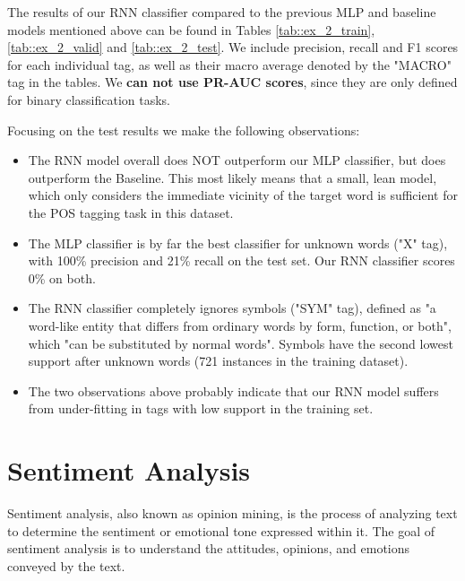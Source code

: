 \documentclass[10pt, a4paper]{article}
\begin{document}
	The results of our RNN classifier compared to the previous MLP and baseline models mentioned above can be found in Tables \ref{tab::ex_2_train}, \ref{tab::ex_2_valid} and \ref{tab::ex_2_test}. We include precision, recall and F1 scores for each individual tag, as well as their macro average denoted by the "MACRO" tag in the tables. We \textbf{can not use PR-AUC scores}, since they are only defined for binary classification tasks.
	
	Focusing on the test results we make the following observations:
	\begin{itemize}
		\item The RNN model overall does NOT outperform our MLP classifier, but does outperform the Baseline. This most likely means that a small, lean model, which only considers the immediate vicinity of the target word is sufficient for the POS tagging task in this dataset.
		
		\item The MLP classifier is by far the best classifier for unknown words ("X" tag), with 100\% precision and 21\% recall on the test set. Our RNN classifier scores 0\% on both.
		
		\item The RNN classifier completely ignores symbols ("SYM" tag), defined as "a word-like entity that differs from ordinary words by form, function, or both", which "can be substituted by normal words". Symbols have the second lowest support after unknown words (721 instances in the training dataset).
		
		\item The two observations above probably indicate that our RNN model suffers from under-fitting in tags with low support in the training set.
	
	\end{itemize}
	
	
	
	
	
	
	
	
	
	\section{Sentiment Analysis}
	
	Sentiment analysis, also known as opinion mining, is the process of analyzing text to determine the sentiment or emotional tone expressed within it. The goal of sentiment analysis is to understand the attitudes, opinions, and emotions conveyed by the text. 
	
\end{document}
